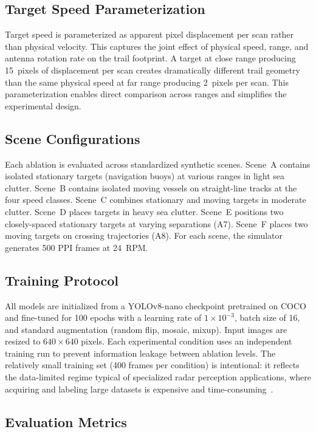 \documentclass[colorlinks,upint,balance]{asmeconf}
\begin{document}
\subsection{Target Speed Parameterization}

Target speed is parameterized as apparent pixel displacement per scan rather than physical velocity. This captures the joint effect of physical speed, range, and antenna rotation rate on the trail footprint. A target at close range producing 15~pixels of displacement per scan creates dramatically different trail geometry than the same physical speed at far range producing 2~pixels per scan. This parameterization enables direct comparison across ranges and simplifies the experimental design.

\subsection{Scene Configurations}

Each ablation is evaluated across standardized synthetic scenes. Scene~A contains isolated stationary targets (navigation buoys) at various ranges in light sea clutter. Scene~B contains isolated moving vessels on straight-line tracks at the four speed classes. Scene~C combines stationary and moving targets in moderate clutter. Scene~D places targets in heavy sea clutter. Scene~E positions two closely-spaced stationary targets at varying separations (A7). Scene~F places two moving targets on crossing trajectories (A8). For each scene, the simulator generates 500 PPI frames at 24~RPM.

\subsection{Training Protocol}

All models are initialized from a YOLOv8-nano checkpoint pretrained on COCO and fine-tuned for 100 epochs with a learning rate of $1 \times 10^{-3}$, batch size of 16, and standard augmentation (random flip, mosaic, mixup). Input images are resized to $640 \times 640$ pixels. Each experimental condition uses an independent training run to prevent information leakage between ablation levels. The relatively small training set (400 frames per condition) is intentional: it reflects the data-limited regime typical of specialized radar perception applications, where acquiring and labeling large datasets is expensive and time-consuming~\cite{Shorten2019DataAugmentation}.

\subsection{Evaluation Metrics}
\end{document}
